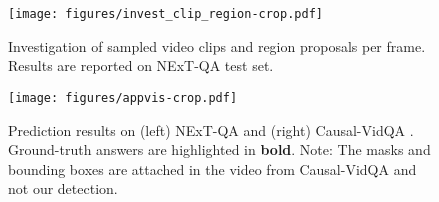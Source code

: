 \documentclass[10pt,journal,compsoc]{IEEEtran}
\begin{document}
\setlength{\tabcolsep}{6pt}
\begin{table}[t!]
    \small
    \centering
    \caption{Study of fine-tuning.
    }
    \label{tab:adapt}
    \vspace{-0.5em}
\end{table}

\begin{figure}[t!]
  \begin{center}
    \texttt{[image: figures/invest\_clip\_region-crop.pdf]}
  \end{center}
  \vspace{-0.5em}
  \caption{Investigation of sampled video clips and region proposals per frame. Results are reported on NExT-QA test set.}
  \label{fig:region}
  \vspace{-0.4cm}
\end{figure}

\begin{figure*}[t!]
\centering
    \texttt{[image: figures/appvis-crop.pdf]}
  \caption{Prediction results on (left) NExT-QA \cite{xiao2021next} and (right) Causal-VidQA \cite{li2022representation}. Ground-truth answers are highlighted in \textbf{bold}. Note: The masks and bounding boxes are attached in the video from Causal-VidQA and not our detection.}
  \label{fig:appvis}
\vspace{-0.4cm}
\end{figure*}
\end{document}
